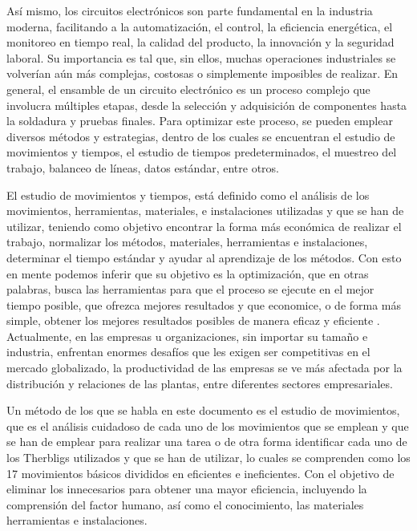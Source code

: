     
    
    Así mismo, los circuitos electrónicos son parte fundamental en la industria moderna, facilitando a la automatización, el control, la eficiencia energética, el monitoreo en tiempo real, la calidad del producto, la innovación y la seguridad laboral. Su importancia es tal que, sin ellos, muchas operaciones industriales se volverían aún más complejas, costosas o simplemente imposibles de realizar. En general, el ensamble de un circuito electrónico es un proceso complejo que involucra múltiples etapas, desde la selección y adquisición de componentes hasta la soldadura y pruebas finales. Para optimizar este proceso, se pueden emplear diversos métodos y estrategias, dentro de los cuales se encuentran el estudio de movimientos y tiempos, el estudio de tiempos predeterminados, el muestreo del trabajo, balanceo de líneas, datos estándar, entre otros.
    
    
    El estudio de movimientos y tiempos, está definido como el análisis de los movimientos, herramientas, materiales, e instalaciones utilizadas y que se han de utilizar, teniendo como objetivo encontrar la forma más económica de realizar el trabajo, normalizar los métodos, materiales, herramientas e instalaciones, determinar el tiempo estándar y ayudar al aprendizaje de los métodos. Con esto en mente podemos inferir que su objetivo es la optimización, que en otras palabras, busca las herramientas para que el proceso se ejecute en el mejor tiempo posible, que ofrezca mejores resultados y que economice, o de forma más simple, obtener los mejores resultados posibles de manera eficaz y eficiente  \cite{RAE}. Actualmente, en las empresas u organizaciones, sin importar su tamaño e industria, enfrentan enormes desafíos que les exigen ser competitivas en el mercado globalizado, la productividad de las empresas se ve más afectada por la distribución y relaciones de las plantas, entre diferentes sectores empresariales.
    
    Un método de los que se habla en este documento es el estudio de movimientos, que es el análisis cuidadoso de cada uno de los movimientos que se emplean y que se han de emplear para realizar una tarea o de otra forma identificar cada uno de los Therbligs utilizados y que se han de utilizar, lo cuales se comprenden como los 17 movimientos básicos divididos en eficientes e ineficientes. Con el objetivo de eliminar los innecesarios para obtener una mayor eficiencia, incluyendo la comprensión del factor humano, así como el conocimiento, las materiales herramientas e instalaciones. \cite{niebel1980ingenieria} 
    
